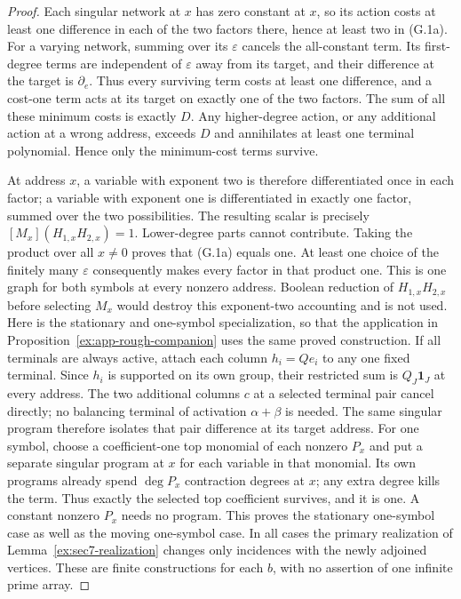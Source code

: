 \documentclass[11pt]{article}
\theoremstyle{definition}
\theoremstyle{remark}
\begin{document}
\begin{proof}
Each singular network at $x$ has zero constant at $x$, so its action
costs at least one difference in each of the two factors there, hence
at least two in (G.1a).  For a varying network, summing over its
$\varepsilon$ cancels the all-constant term.  Its first-degree
terms are independent of $\varepsilon$ away from its target, and
their difference at the target is $\partial_e$.  Thus every
surviving term costs at least one difference, and a cost-one term
acts at its target on exactly one of the two factors.  The sum of
all these minimum costs is exactly $D$.  Any higher-degree action,
or any additional action at a wrong address, exceeds $D$ and
annihilates at least one terminal polynomial.  Hence only the
minimum-cost terms survive.

At address $x$, a variable with exponent two is therefore
differentiated once in each factor; a variable with exponent one
is differentiated in exactly one factor, summed over the two
possibilities.  The resulting scalar is precisely
$[M_x](H_{1,x}H_{2,x})=1$.  Lower-degree parts cannot contribute.
Taking the product over all $x\ne0$ proves that (G.1a) equals one.
At least one choice of the finitely many $\varepsilon$ consequently
makes every factor in that product one.  This is one graph for both
symbols at every nonzero address.  Boolean reduction of
$H_{1,x}H_{2,x}$ before selecting $M_x$ would destroy this
exponent-two accounting and is not used.
Here is the stationary and one-symbol specialization, so that the
application in Proposition~\ref{ex:app-rough-companion} uses the same
proved construction. If all terminals are always active, attach
each column $h_i=Qe_i$ to any one fixed terminal. Since $h_i$ is
supported on its own group, their restricted sum is
$Q_J\mathbf1_J$ at every address. The two additional columns $c$
at a selected terminal pair cancel directly; no balancing terminal
of activation $\alpha+\beta$ is needed. The same singular program
therefore isolates that pair difference at its target address.
For one symbol, choose a coefficient-one top monomial of each
nonzero $P_x$ and put a separate singular program at $x$ for each
variable in that monomial. Its own programs already spend
$\deg P_x$ contraction degrees at $x$; any extra degree kills the
term. Thus exactly the selected top coefficient survives, and it
is one. A constant nonzero $P_x$ needs no program. This proves the
stationary one-symbol case as well as the moving one-symbol case.
In all cases the primary realization of
Lemma~\ref{ex:sec7-realization} changes only incidences with
the newly adjoined vertices. These are finite constructions for
each $b$, with no assertion of one infinite prime array.

\end{proof}
\end{document}
